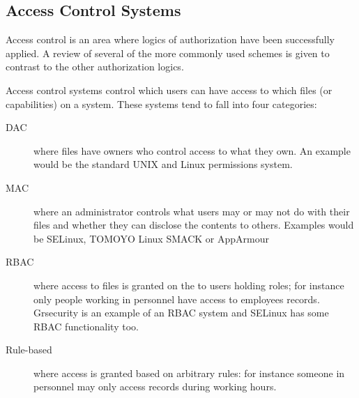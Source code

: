 \documentclass[a4paper,sfsidenotes]{%
  article%
}
\begin{document}
\begin{algorithm}[H]
\end{algorithm}



\subsection{Access Control Systems}

Access control is an area where logics of authorization have been successfully
applied. A review of several of the more commonly used schemes is given to contrast
to the other authorization logics.

Access control systems control which users can have access to which
files (or capabilities) on a system.  These systems tend to fall into four categories:

\begin{description}
  \item[\ac{DAC}] where files have owners who control access to what they own.
    An example would be the standard UNIX and Linux permissions system.
  \item[\ac{MAC}] where an administrator controls what users may or may not do
    with their files and whether they can disclose the contents to others.
    Examples would be SELinux, TOMOYO Linux SMACK or AppArmour
  \item[\ac{RBAC}] where access to files is granted on the to users holding
    roles; for instance only people working in personnel have access to
    employees records.  Grsecurity is an example of an \ac{RBAC} system and SELinux has some \ac{RBAC} functionality too.
  \item[Rule-based] where access is granted based on arbitrary rules: for
    instance someone in personnel may only access records during working hours.
\end{description}
\end{document}
